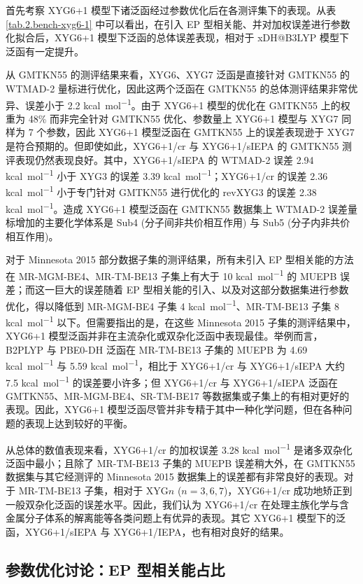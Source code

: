 首先考察 XYG6+1 模型下诸泛函经过参数优化后在各测评集下的表现。从表 \ref{tab.2.bench-xyg6-1} 中可以看出，在引入 EP 型相关能、并对加权误差进行参数化拟合后，XYG6+1 模型下泛函的总体误差表现，相对于 xDH@B3LYP 模型下泛函有一定提升。

从 GMTKN55 的测评结果来看，XYG6、XYG7 泛函是直接针对 GMTKN55 的 WTMAD-2 量标进行优化，因此这两个泛函在 GMTKN55 的总体测评结果非常优异、误差小于 2.2 \si{kcal.mol^{-1}}。由于 XYG6+1 模型的优化在 GMTKN55 上的权重为 48\% 而非完全针对 GMTKN55 优化、参数量上 XYG6+1 模型与 XYG7 同样为 7 个参数，因此 XYG6+1 模型泛函在 GMTKN55 上的误差表现逊于 XYG7 是符合预期的。但即使如此，XYG6+1/cr 与 XYG6+1/sIEPA 的 GMTKN55 测评表现仍然表现良好。其中，XYG6+1/sIEPA 的 WTMAD-2 误差 2.94 \si{kcal.mol^{-1}} 小于 XYG3 的误差 3.39 \si{kcal.mol^{-1}}；XYG6+1/cr 的误差 2.36 \si{kcal.mol^{-1}} 小于专门针对 GMTKN55 进行优化的 revXYG3 的误差 2.38 \si{kcal.mol^{-1}}。造成 XYG6+1 模型泛函在 GMTKN55 数据集上 WTMAD-2 误差量标增加的主要化学体系是 Sub4 (分子间非共价相互作用) 与 Sub5 (分子内非共价相互作用)。

对于 Minnesota 2015 部分数据子集的测评结果，所有未引入 EP 型相关能的方法在 MR-MGM-BE4、MR-TM-BE13 子集上有大于 10 \si{kcal.mol^{-1}} 的 MUEPB 误差；而这一巨大的误差随着 EP 型相关能的引入、以及对这部分数据集进行参数优化，得以降低到 MR-MGM-BE4 子集 4 \si{kcal.mol^{-1}}、MR-TM-BE13 子集 8 \si{kcal.mol^{-1}} 以下。但需要指出的是，在这些 Minnesota 2015 子集的测评结果中，XYG6+1 模型泛函并非在主流杂化或双杂化泛函中表现最佳。举例而言，B2PLYP 与 PBE0-DH 泛函在 MR-TM-BE13 子集的 MUEPB 为 4.69 \si{kcal.mol^{-1}} 与 5.59 \si{kcal.mol^{-1}}，相比于 XYG6+1/cr 与 XYG6+1/sIEPA 大约 7.5 \si{kcal.mol^{-1}} 的误差要小许多；但 XYG6+1/cr 与 XYG6+1/sIEPA 泛函在 GMTKN55、MR-MGM-BE4、SR-TM-BE17 等数据集或子集上的有相对更好的表现。因此，XYG6+1 模型泛函尽管并非专精于其中一种化学问题，但在各种问题的表现上达到较好的平衡。

从总体的数值表现来看，XYG6+1/cr 的加权误差 3.28 \si{kcal.mol^{-1}} 是诸多双杂化泛函中最小；且除了 MR-TM-BE13 子集的 MUEPB 误差稍大外，在 GMTKN55 数据集与其它经测评的 Minnesota 2015 数据集上的误差都有非常良好的表现。对于 MR-TM-BE13 子集，相对于 XYG$n$ ($n=3,6,7$)，XYG6+1/cr 成功地矫正到一般双杂化泛函的误差水平。因此，我们认为 XYG6+1/cr 在处理主族化学与含金属分子体系的解离能等各类问题上有优异的表现。其它 XYG6+1 模型下的泛函，XYG6+1/sIEPA 与 XYG6+1/IEPA，也有相对良好的结果。

\subsection{参数优化讨论：EP 型相关能占比}
\label{sec.2.proportion-iepa-like}

